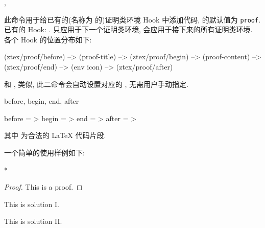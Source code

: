 \begin{function}[updated=2025-04-25]{\zthmproofhook, \zthmproofhook*}
  \begin{syntax}
  \end{syntax}
  此命令用于给已有的(名称为  的)证明类环境 Hook 中添加代码,  的默认值为 \texttt{proof}.
  已有的 Hook: . 
   只应用于下一个证明类环境,  会应用于接下来的所有证明类环境.
  各个 Hook 的位置分布如下:
\end{function}
\def\exampleUR{}
\begin{DocExample}[@@]
(ztex/proof/before) --> (proof-title)  
  --> (ztex/proof/begin) --> 
      (proof-content) 
  --> (ztex/proof/end)   -->
(env icon) --> (ztex/proof/after)
\end{DocExample}
\resetExampleUR

和 ,  类似, 此二命令会自动设置对应的 , 无需用户手动指定.


\begin{keyval}[parent=..]{before, begin, end, after}
  \begin{syntax}
    before = >
    begin  = >
    end    = >
    after  = >
  \end{syntax}
  其中  为合法的 \LaTeX{} 代码片段.
\end{keyval}
一个简单的使用样例如下:
\begin{DocExample}*
\begin{proof}
  This is a proof.
\end{proof}
\begin{solution}
  This is solution I.
\end{solution}
\begin{solution}
  This is solution II.
\end{solution}
\end{DocExample}



